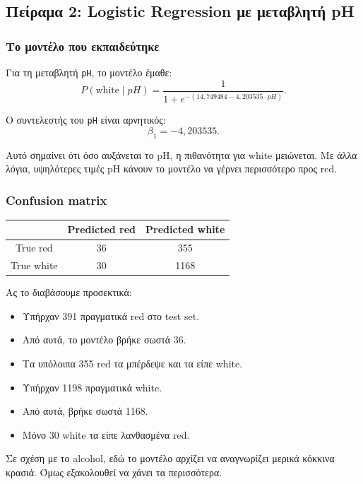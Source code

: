 \documentclass[11pt,a4paper]{article}
\newcommand{\code}[1]{\texttt{#1}}
\begin{document}
\subsection{Πείραμα 2: Logistic Regression με μεταβλητή pH}

\subsubsection{Το μοντέλο που εκπαιδεύτηκε}

Για τη μεταβλητή \code{pH}, το μοντέλο έμαθε:
\[
P(\text{white} \mid pH) =
\frac{1}{1 + e^{-(14{,}749484 - 4{,}203535 \cdot pH)}}.
\]

Ο συντελεστής του \code{pH} είναι αρνητικός:
\[
\beta_1 = -4{,}203535.
\]

Αυτό σημαίνει ότι όσο αυξάνεται το pH, η πιθανότητα για white μειώνεται.
Με άλλα λόγια, υψηλότερες τιμές pH κάνουν το μοντέλο να γέρνει περισσότερο
προς red.

\subsubsection{Confusion matrix}

\begin{center}
\begin{tabular}{c|cc}
\toprule
 & Predicted red & Predicted white \\
\midrule
True red & 36 & 355 \\
True white & 30 & 1168 \\
\bottomrule
\end{tabular}
\end{center}

Ας το διαβάσουμε προσεκτικά:
\begin{itemize}
    \item Υπήρχαν 391 πραγματικά red στο test set.
    \item Από αυτά, το μοντέλο βρήκε σωστά 36.
    \item Τα υπόλοιπα 355 red τα μπέρδεψε και τα είπε white.
    \item Υπήρχαν 1198 πραγματικά white.
    \item Από αυτά, βρήκε σωστά 1168.
    \item Μόνο 30 white τα είπε λανθασμένα red.
\end{itemize}

Σε σχέση με το alcohol, εδώ το μοντέλο αρχίζει να αναγνωρίζει μερικά κόκκινα
κρασιά. Όμως εξακολουθεί να χάνει τα περισσότερα.
\end{document}
